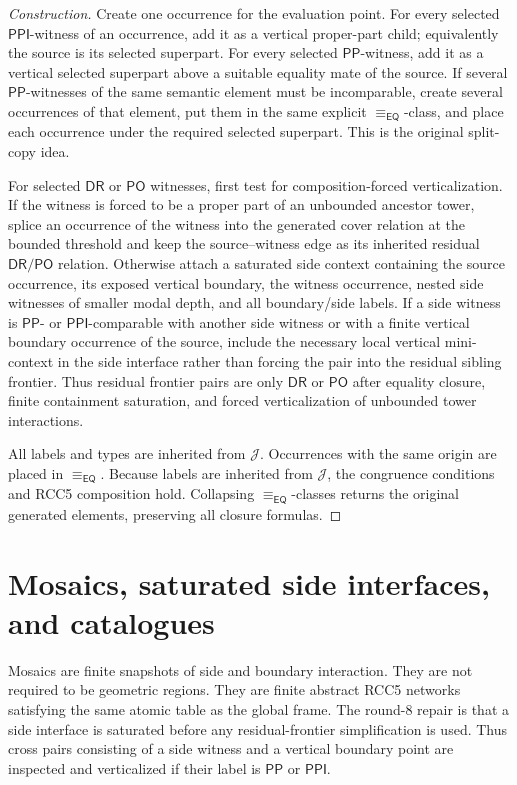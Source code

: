 \documentclass[11pt]{article}
\newcommand{\EQ}{\mathsf{EQ}}
\newcommand{\PP}{\mathsf{PP}}
\newcommand{\PPI}{\mathsf{PPI}}
\newcommand{\PO}{\mathsf{PO}}
\newcommand{\DR}{\mathsf{DR}}
\newcommand{\J}{\mathcal J}
\newcommand{\eqc}{\equiv_{\EQ}}
\begin{document}
\begin{proof}[Construction]
Create one occurrence for the evaluation point.  For every selected \(\PPI\)-witness of an occurrence, add it as a vertical proper-part child; equivalently the source is its selected superpart.  For every selected \(\PP\)-witness, add it as a vertical selected superpart above a suitable equality mate of the source.  If several \(\PP\)-witnesses of the same semantic element must be incomparable, create several occurrences of that element, put them in the same explicit \(\eqc\)-class, and place each occurrence under the required selected superpart.  This is the original split-copy idea.

For selected \(\DR\) or \(\PO\) witnesses, first test for composition-forced verticalization.  If the witness is forced to be a proper part of an unbounded ancestor tower, splice an occurrence of the witness into the generated cover relation at the bounded threshold and keep the source--witness edge as its inherited residual \(\DR/\PO\) relation.  Otherwise attach a saturated side context containing the source occurrence, its exposed vertical boundary, the witness occurrence, nested side witnesses of smaller modal depth, and all boundary/side labels.  If a side witness is \(\PP\)- or \(\PPI\)-comparable with another side witness or with a finite vertical boundary occurrence of the source, include the necessary local vertical mini-context in the side interface rather than forcing the pair into the residual sibling frontier.  Thus residual frontier pairs are only \(\DR\) or \(\PO\) after equality closure, finite containment saturation, and forced verticalization of unbounded tower interactions.

All labels and types are inherited from \(\J\).  Occurrences with the same origin are placed in \(\eqc\).  Because labels are inherited from \(\J\), the congruence conditions and RCC5 composition hold.  Collapsing \(\eqc\)-classes returns the original generated elements, preserving all closure formulas.
\end{proof}

\section{Mosaics, saturated side interfaces, and catalogues}

Mosaics are finite snapshots of side and boundary interaction.  They are not required to be geometric regions.  They are finite abstract RCC5 networks satisfying the same atomic table as the global frame.  The round-8 repair is that a side interface is saturated before any residual-frontier simplification is used.  Thus cross pairs consisting of a side witness and a vertical boundary point are inspected and verticalized if their label is \(\PP\) or \(\PPI\).
\end{document}

